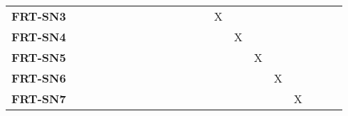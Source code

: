 \documentclass[12pt, titlepage]{article}
\begin{document}
\begin{landscape}
\begin{longtable}{|l|cccccccccccccccc|}
		\textbf{FRT-SN3} & ~                                                         & ~             & ~             & ~             & ~             & ~             & ~             & ~             & X             & ~             & ~             & ~             & ~             \\
		\textbf{FRT-SN4} & ~                                                         & ~             & ~             & ~             & ~             & ~             & ~             & ~             & ~             & X             & ~             & ~             & ~             \\
		\textbf{FRT-SN5} & ~                                                         & ~             & ~             & ~             & ~             & ~             & ~             & ~             & ~             & ~             & X             & ~             & ~             \\
		\textbf{FRT-SN6} & ~                                                         & ~             & ~             & ~             & ~             & ~             & ~             & ~             & ~             & ~             & ~             & X             & ~             \\
		\textbf{FRT-SN7} & ~                                                         & ~             & ~             & ~             & ~             & ~             & ~             & ~             & ~             & ~             & ~             & ~             & X             \\
		\hline
	\end{longtable}

	\newpage


\end{landscape}
\end{document}
